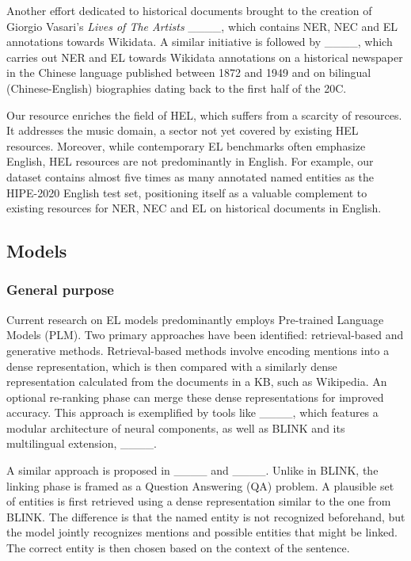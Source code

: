 Another effort dedicated to historical documents brought to the creation of Giorgio Vasari's \textit{Lives of The Artists} ____, which contains NER, NEC and EL annotations towards Wikidata.
A similar initiative is followed by ____, which carries out NER and EL towards Wikidata annotations on a historical newspaper in the Chinese language published between 1872 and 1949 and on bilingual (Chinese-English) biographies dating back to the first half of the 20C.

Our resource enriches the field of HEL, which suffers from a scarcity of resources. It addresses the music domain, a sector not yet covered by existing HEL resources. Moreover, while contemporary EL benchmarks often emphasize English, HEL resources are not predominantly in English. For example, our dataset contains almost five times as many annotated named entities as the HIPE-2020 English test set, positioning itself as a valuable complement to existing resources for NER, NEC and EL on historical documents in English.
 
\subsection{Models} \label{sec:related:models}
\subsubsection*{General purpose}
Current research on EL models predominantly employs Pre-trained Language Models (PLM). Two primary approaches have been identified: retrieval-based and generative methods. Retrieval-based methods involve encoding mentions into a dense representation, which is then compared with a similarly dense representation calculated from the documents in a KB, such as Wikipedia. An optional re-ranking phase can merge these dense representations for improved accuracy. This approach is exemplified by tools like ____, which features a modular architecture of neural components, as well as BLINK and its multilingual extension, ____.

A similar approach is proposed in ____ and ____. Unlike in BLINK, the linking phase is framed as a Question Answering (QA) problem.
A plausible set of entities is first retrieved using a dense representation similar to the one from BLINK.
The difference is that the named entity is not recognized beforehand, but the model jointly recognizes mentions and possible entities that might be linked.
The correct entity is then chosen based on the context of the sentence.

